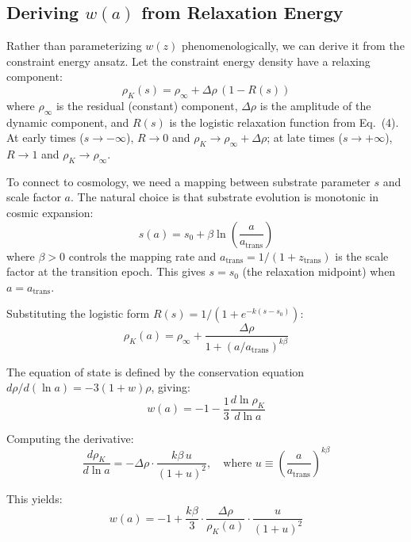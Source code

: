\documentclass[11pt,a4paper]{article}
\begin{document}
\subsection{Deriving $w(a)$ from Relaxation Energy}

Rather than parameterizing $w(z)$ phenomenologically, we can derive it from the constraint energy ansatz. Let the constraint energy density have a relaxing component:
\begin{equation}
    \rho_K(s) = \rho_\infty + \Delta\rho\,(1 - R(s))
    \label{eq:rho_K}
\end{equation}
where $\rho_\infty$ is the residual (constant) component, $\Delta\rho$ is the amplitude of the dynamic component, and $R(s)$ is the logistic relaxation function from Eq.~(4). At early times ($s \to -\infty$), $R \to 0$ and $\rho_K \to \rho_\infty + \Delta\rho$; at late times ($s \to +\infty$), $R \to 1$ and $\rho_K \to \rho_\infty$.

To connect to cosmology, we need a mapping between substrate parameter $s$ and scale factor $a$. The natural choice is that substrate evolution is monotonic in cosmic expansion:
\begin{equation}
    s(a) = s_0 + \beta \ln\left(\frac{a}{a_{\mathrm{trans}}}\right)
\end{equation}
where $\beta > 0$ controls the mapping rate and $a_{\mathrm{trans}} = 1/(1+z_{\mathrm{trans}})$ is the scale factor at the transition epoch. This gives $s = s_0$ (the relaxation midpoint) when $a = a_{\mathrm{trans}}$.

Substituting the logistic form $R(s) = 1/(1 + e^{-k(s-s_0)})$:
\begin{equation}
    \rho_K(a) = \rho_\infty + \frac{\Delta\rho}{1 + (a/a_{\mathrm{trans}})^{k\beta}}
\end{equation}

The equation of state is defined by the conservation equation $d\rho/d(\ln a) = -3(1+w)\rho$, giving:
\begin{equation}
    w(a) = -1 - \frac{1}{3}\frac{d\ln\rho_K}{d\ln a}
\end{equation}

Computing the derivative:
\begin{equation}
    \frac{d\rho_K}{d\ln a} = -\Delta\rho \cdot \frac{k\beta\, u}{(1+u)^2}, \quad \text{where } u \equiv \left(\frac{a}{a_{\mathrm{trans}}}\right)^{k\beta}
\end{equation}

This yields:
\begin{equation}
    w(a) = -1 + \frac{k\beta}{3} \cdot \frac{\Delta\rho}{\rho_K(a)} \cdot \frac{u}{(1+u)^2}
    \label{eq:w_derived}
\end{equation}
\end{document}
